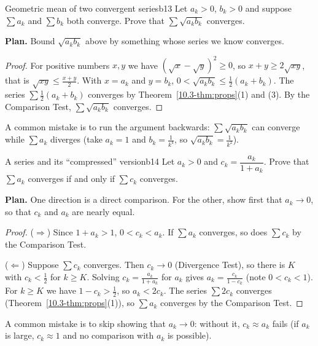 \documentclass[11pt]{article}
\begin{document}
\begin{exmp}{Geometric mean of two convergent series}{b13}
Let $a_k>0$, $b_k>0$ and suppose $\sum a_k$ and $\sum b_k$ both converge. Prove that $\sum\sqrt{a_kb_k}$ converges.

\textbf{Plan.} Bound $\sqrt{a_kb_k}$ above by something whose series we know converges.

\begin{proof}
For positive numbers $x,y$ we have $(\sqrt x-\sqrt y)^2\ge0$, so $x+y\ge2\sqrt{xy}$, that is $\sqrt{xy}\le\frac{x+y}2$. With $x=a_k$ and $y=b_k$, $0<\sqrt{a_kb_k}\le\frac12(a_k+b_k)$. The series $\sum\frac12(a_k+b_k)$ converges by Theorem~\ref{10.3-thm:props}(1) and (3). By the Comparison Test, $\sum\sqrt{a_kb_k}$ converges.
\end{proof}
A common mistake is to run the argument backwards: $\sum\sqrt{a_kb_k}$ can converge while $\sum a_k$ diverges (take $a_k=1$ and $b_k=\frac1{k^4}$, so $\sqrt{a_kb_k}=\frac1{k^2}$).
\end{exmp}

\begin{exmp}{A series and its ``compressed'' version}{b14}
Let $a_k>0$ and $c_k=\dfrac{a_k}{1+a_k}$. Prove that $\sum a_k$ converges if and only if $\sum c_k$ converges.

\textbf{Plan.} One direction is a direct comparison. For the other, show first that $a_k\to0$, so that $c_k$ and $a_k$ are nearly equal.

\begin{proof}
($\Rightarrow$) Since $1+a_k>1$, $0<c_k<a_k$. If $\sum a_k$ converges, so does $\sum c_k$ by the Comparison Test.

($\Leftarrow$) Suppose $\sum c_k$ converges. Then $c_k\to0$ (Divergence Test), so there is $K$ with $c_k<\frac12$ for $k\ge K$. Solving $c_k=\frac{a_k}{1+a_k}$ for $a_k$ gives $a_k=\frac{c_k}{1-c_k}$ (note $0<c_k<1$). For $k\ge K$ we have $1-c_k>\frac12$, so $a_k<2c_k$. The series $\sum2c_k$ converges (Theorem~\ref{10.3-thm:props}(1)), so $\sum a_k$ converges by the Comparison Test.
\end{proof}
A common mistake is to skip showing that $a_k\to0$: without it, $c_k\approx a_k$ fails (if $a_k$ is large, $c_k\approx1$ and no comparison with $a_k$ is possible).
\end{exmp}
\end{document}
